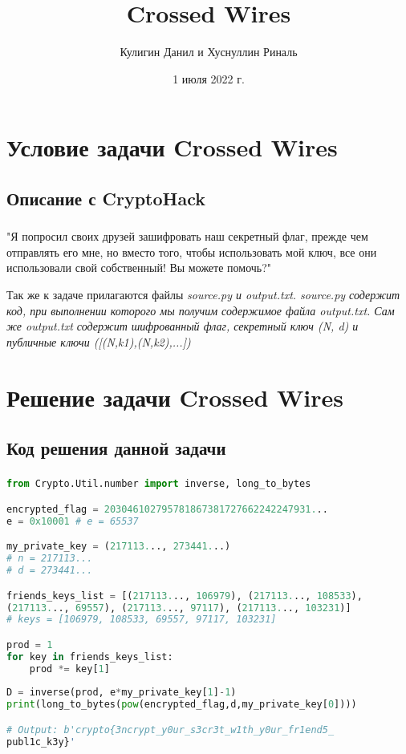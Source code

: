 \documentclass[t]{beamer}
\title{Crossed Wires}
\author{Кулигин Данил и Хуснуллин Риналь}
\date{1 июля 2022 г.}
\institute[БФУ им. Иммануила Канта]{ИФМНиИТ \\ Компьютерная безопасность, 2 курс}
\begin{document}
\frame[plain]{\titlepage}	%

\section{Условие задачи Crossed Wires}
\subsection{Описание с CryptoHack}
\begin{frame}
	\frametitle{\insertsection}
	\framesubtitle{\insertsubsection}
    \begin{itemize}
    "Я попросил своих друзей зашифровать наш секретный флаг, прежде чем отправлять его мне, но вместо того, чтобы использовать мой ключ, все они использовали свой собственный! Вы можете помочь?"\newline\newline
    
    Так же к задаче прилагаются файлы \slshape source.py \upshape и \slshape output.txt.
    source.py \upshape содержит код, при выполнении которого мы получим содержимое файла \slshape output.txt. \upshape Сам же \slshape output.txt \upshape содержит шифрованный флаг, секретный ключ (N, d) и публичные ключи ([(N,k1),(N,k2),...])

    \end{itemize}
\end{frame}

\section{Решение задачи Crossed Wires}

\subsection{Код решения данной задачи}

\begin{frame}[fragile]
	\frametitle{\insertsection} 
	\framesubtitle{\insertsubsection}
	\footnotesize
	\smaller
\begin{lstlisting}[language=Python]
from Crypto.Util.number import inverse, long_to_bytes

encrypted_flag = 203046102795781867381727662242247931...
e = 0x10001 # e = 65537

my_private_key = (217113..., 273441...)
# n = 217113...
# d = 273441...

friends_keys_list = [(217113..., 106979), (217113..., 108533), 
(217113..., 69557), (217113..., 97117), (217113..., 103231)]
# keys = [106979, 108533, 69557, 97117, 103231]

prod = 1
for key in friends_keys_list:
    prod *= key[1]
    
D = inverse(prod, e*my_private_key[1]-1)
print(long_to_bytes(pow(encrypted_flag,d,my_private_key[0])))

# Output: b'crypto{3ncrypt_y0ur_s3cr3t_w1th_y0ur_fr1end5_
publ1c_k3y}'
\end{lstlisting}
	
\end{frame}
\end{document}
